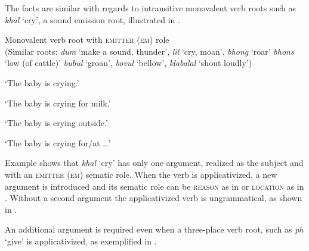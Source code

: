 \documentclass[output=paper]{langsci/langscibook}
\begin{document}
 The facts are similar with regards to intransitive monovalent verb roots such as \textit{khal} ‘cry’, a sound emission root, illustrated in . 

\ea\label{ex:sibanda:3}
\settowidth{}
{Monovalent verb root with \textsc{emitter} (\textsc{em}) role}\\
(Similar roots: \textit{dum} ‘make a sound, thunder’, \textit{lil} ‘cry, moan’, \textit{bhong} ‘roar’ \textit{bhons} ‘low (of cattle)’ \textit{bubul} ‘groan’, \textit{bovul} ‘bellow’, \textit{klabalal} ‘shout loudly’)\\

\glt ‘The baby is crying.’


\glt ‘The baby is crying for milk.’ 

\glt ‘The baby is crying outside.’


\glt ‘The baby is crying for/at …’
\z
\z

Example  shows that \textit{khal} ‘cry’ has only one argument, realized as the subject and with an \textsc{emitter} (\textsc{em}) sematic role. When the verb is applicativized, a new argument is introduced and its sematic role can be \textsc{reason} as in  or \textsc{location} as in . Without a second argument the applicativized verb is ungrammatical, as shown in .

 An additional argument is required even when a three-place verb root, such as \textit{ph} ‘give’ is applicativized, as exemplified in . 
\end{document}
